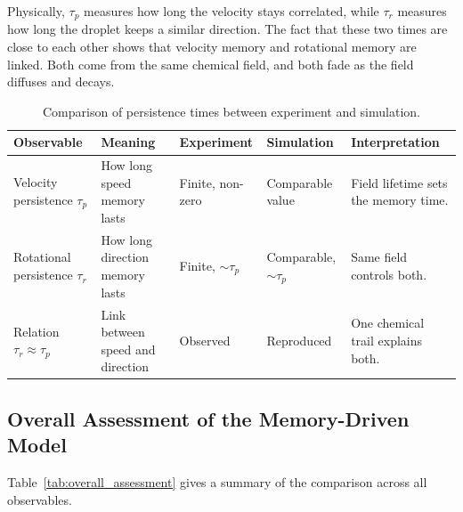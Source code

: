 Physically, $\tau_p$ measures how long the velocity stays correlated, while $\tau_r$ measures how long the droplet keeps a similar direction. The fact that these two times are close to each other shows that velocity memory and rotational memory are linked. Both come from the same chemical field, and both fade as the field diffuses and decays.

\begin{table}[htbp]
\centering
\caption{Comparison of persistence times between experiment and simulation.}
\label{tab:persistence_comparison}
\renewcommand{\arraystretch}{1.25}
\begin{tabular}{p{2.4cm} p{3.0cm} p{2.3cm} p{2.3cm} p{3.2cm}}
\hline\hline
\textbf{Observable} & \textbf{Meaning} & \textbf{Experiment} & \textbf{Simulation} & \textbf{Interpretation} \\
\hline
Velocity persistence $\tau_p$ & How long speed memory lasts & Finite, non-zero & Comparable value & Field lifetime sets the memory time. \\[4pt]
Rotational persistence $\tau_r$ & How long direction memory lasts & Finite, $\sim\tau_p$ & Comparable, $\sim\tau_p$ & Same field controls both. \\[4pt]
Relation $\tau_r \approx \tau_p$ & Link between speed and direction & Observed & Reproduced & One chemical trail explains both. \\
\hline\hline
\end{tabular}
\end{table}

\subsection{Overall Assessment of the Memory-Driven Model}
\label{subsec:comp_overall}

Table~\ref{tab:overall_assessment} gives a summary of the comparison across all observables.

